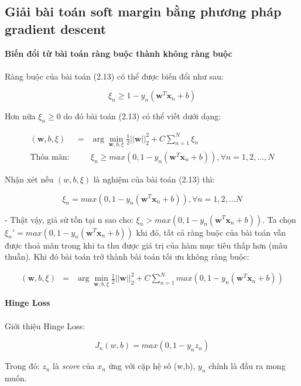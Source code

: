 \documentclass[a4paper, 12pt, oneside]{report}
\begin{document}
\subsection{Giải bài toán soft margin bằng phương pháp gradient descent}
\textbf{Biến đổi từ bài toán ràng buộc thành không ràng buộc}\\ \\
Ràng buộc của bài toán (2.13) có thể được biến đổi như sau: 
\begin{mybox}
$$ \xi_n \geq 1 - y_n(\mathbf{w}^T\mathbf{x}_n + b) $$ 
\end{mybox}
Hơn nữa $\xi_n \geq 0$ do đó bài toán (2.13) có thể viết dưới dạng: 
\begin{mybox}
\begin{eqnarray}
    (\mathbf{w}, b, \xi) &=& \arg \min_{\mathbf{w}, b, \xi} \frac{1}{2}{||\mathbf{w}||_2^2} + C \sum_{n=1}^N \xi_n  \\
    \text{Thỏa mãn:}~ && \xi_n \geq max(0,1 -y_n(\mathbf{w}^T\mathbf{x}_n + b)), \forall n = 1, 2, \dots, N 
\end{eqnarray}
\end{mybox}
Nhận xét nếu $(w,b,\xi)$ là nghiệm của bài toán (2.13) thì:
\begin{mybox}
$$\xi_n = max(0,1 - y_n(\mathbf{w}^T\mathbf{x}_n + b)), \forall n= 1,2,...N$$ \end{mybox}
- Thật vậy, giả sử tồn tại n sao cho: $\xi_n > max(0,1 - y_n(\mathbf{w}^T\mathbf{x}_n + b))$. Ta chọn $\xi_n' = max(0,1 - y_n(\mathbf{w}^T\mathbf{x}_n + b))$ khi đó, tất cả ràng buộc của bài toán vẫn được thoả mãn trong khi ta thu được giá trị của hàm mục tiêu thấp hơn (mâu thuẫn). Khi đó bài toán trở thành bài toán tối ưu không ràng buộc: \\ 
\begin{mybox}
\begin{eqnarray}
    (\mathbf{w}, b, \xi) &=& \arg \min_{\mathbf{w}, b, \xi} \frac{1}{2}{||\mathbf{w}||_2^2} + C \sum_{n=1}^N {max(0,1 - y_n(\mathbf{w}^T\mathbf{x}_n + b))}  
\end{eqnarray}
\end{mybox}
\textbf{Hinge Loss}\\ \\
Giới thiệu Hinge Loss: 
\begin{mybox}
$$J_n(w,b) = max(0, 1 -y_nz_n)$$
\end{mybox}
Trong đó: $z_n$ là \textit{score} của $x_n$ ứng với cặp hệ số (w,b), $y_n$ chính là đầu ra mong muốn. 
\end{document}
